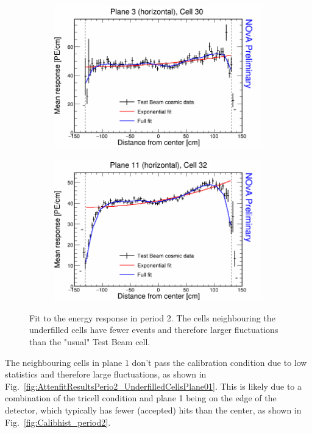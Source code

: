 \begin{figure}[h]
  \begin{subfigure}{0.495\textwidth}
    \includegraphics[width=\linewidth]{Plots/RelativeCalibrationResults/p2_003_030.png}
  \end{subfigure}
  \begin{subfigure}{0.495\textwidth}
    \includegraphics[width=\linewidth]{Plots/RelativeCalibrationResults/p2_011_032.png}
  \end{subfigure}
  \caption[Attenuation fits for underfilled cells in period 2 data]{Fit to the energy response in period 2. The cells neighbouring the underfilled cells have fewer events and therefore larger fluctuations than the "usual" Test Beam cell.}
  \label{fig:AttenfitResultsPerio2_UnderfilledCells}
\end{figure}

The neighbouring cells in plane 1 don't pass the calibration condition due to low statistics and therefore large fluctuations, as shown in Fig.~\ref{fig:AttenfitResultsPerio2_UnderfilledCellsPlane01}. This is likely due to a combination of the tricell condition and plane 1 being on the edge of the detector, which typically has fewer (accepted) hits than the center, as shown in Fig.~\ref{fig:Calibhist_period2}.

